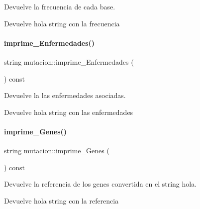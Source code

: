 Devuelve la frecuencia de cada base. 

\begin{DoxyReturn}{Devuelve}
hola string con la frecuencia 
\end{DoxyReturn}
\hypertarget{classmutacion_a5814ecb09adcac85f44d6e5fd1f6faf7}{}\label{classmutacion_a5814ecb09adcac85f44d6e5fd1f6faf7} 
\paragraph{\texorpdfstring{imprime\+\_\+\+Enfermedades()}{imprime\_Enfermedades()}}
{\footnotesize\ttfamily string mutacion\+::imprime\+\_\+\+Enfermedades (\begin{DoxyParamCaption}{ }\end{DoxyParamCaption}) const}



Devuelve la las enfermedades asociadas. 

\begin{DoxyReturn}{Devuelve}
hola string con las enfermedades 
\end{DoxyReturn}
\hypertarget{classmutacion_a9da6a306521e0ed298ec1f178ecc91cc}{}\label{classmutacion_a9da6a306521e0ed298ec1f178ecc91cc} 
\paragraph{\texorpdfstring{imprime\+\_\+\+Genes()}{imprime\_Genes()}}
{\footnotesize\ttfamily string mutacion\+::imprime\+\_\+\+Genes (\begin{DoxyParamCaption}{ }\end{DoxyParamCaption}) const}



Devuelve la referencia de los genes convertida en el string hola. 

\begin{DoxyReturn}{Devuelve}
hola string con la referencia 
\end{DoxyReturn}
\hypertarget{classmutacion_a1533331f8cccf92c2b6468c0ec21a391}{}\label{classmutacion_a1533331f8cccf92c2b6468c0ec21a391} 
